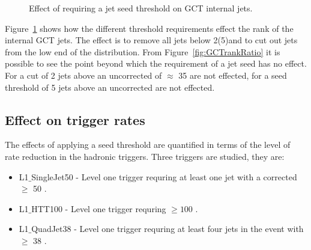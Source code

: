 \begin{figure}[h!]
    \centering
    \caption{Effect of requiring a jet seed threshold on GCT internal jets.}
    \label{fig:GCTrank}
\end{figure}


Figure~\ref{fig:GCTrank} shows how the different threshold requirements effect 
the rank of the internal GCT jets. The effect is to remove all jets below 
2(5)\GeV and to cut out jets from the low end of the distribution. From 
Figure~\ref{fig:GCTrankRatio} it is possible to see the point beyond which the 
requirement of a jet seed has no effect. For a cut of 2 \GeV jets above an 
uncorrected \ET of $\approx$ 35 \GeV are not effected, for a seed threshold of 
5 \GeV jets above an uncorrected  \GeV are not effected.


\subsection{Effect on trigger rates} %
\label{sec:Effects on Rate}
The effects of applying a seed threshold are quantified in terms of the level of rate
reduction in the \Lone hadronic triggers.
Three triggers are studied, they are:
\begin{itemize}
  \item L1$\_$SingleJet50 - Level one trigger requring at least one jet with a 
  corrected \ET $\geq$ 50 \GeV.
  \item L1$\_$HTT100 - Level one trigger requring \HT $\geq 100$ \GeV.
  \item L1$\_$QuadJet38 - Level one trigger requring at least four jets in the 
  event with \ET $\geq$ 38 \GeV.

\end{itemize}
